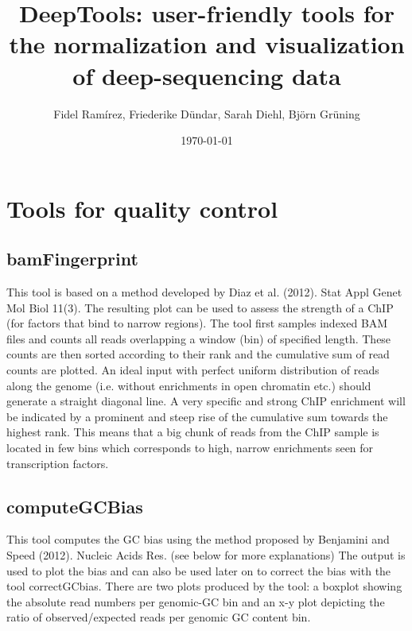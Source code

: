 \documentclass[11pt,a4paper]{article}
\begin{document}
\title{DeepTools: user-friendly tools for the normalization and
  visualization of deep-sequencing data} 

\author{Fidel Ramírez, Friederike Dündar, Sarah Diehl, Björn Grüning}

\date{\today}

\maketitle


\tableofcontents

\section{Tools for quality control}

\subsection{bamFingerprint}

This tool is based on a method developed by Diaz et al. (2012). Stat
Appl Genet Mol Biol 11(3).  The resulting plot can be used to assess
the strength of a ChIP (for factors that bind to narrow regions).  The
tool first samples indexed BAM files and counts all reads overlapping
a window (bin) of specified length.  These counts are then sorted
according to their rank and the cumulative sum of read counts are
plotted. An ideal input with perfect uniform distribution of reads
along the genome (i.e. without enrichments in open chromatin etc.)
should generate a straight diagonal line. A very specific and strong
ChIP enrichment will be indicated by a prominent and steep rise of the
cumulative sum towards the highest rank. This means that a big chunk
of reads from the ChIP sample is located in few bins which corresponds
to high, narrow enrichments seen for transcription factors.


\subsection{computeGCBias}

This tool computes the GC bias using the method proposed by Benjamini
and Speed (2012). Nucleic Acids Res. (see below for more explanations)
The output is used to plot the bias and can also be used later on to
correct the bias with the tool correctGCbias.  There are two plots
produced by the tool: a boxplot showing the absolute read numbers per
genomic-GC bin and an x-y plot depicting the ratio of
observed/expected reads per genomic GC content bin.
\end{document}

